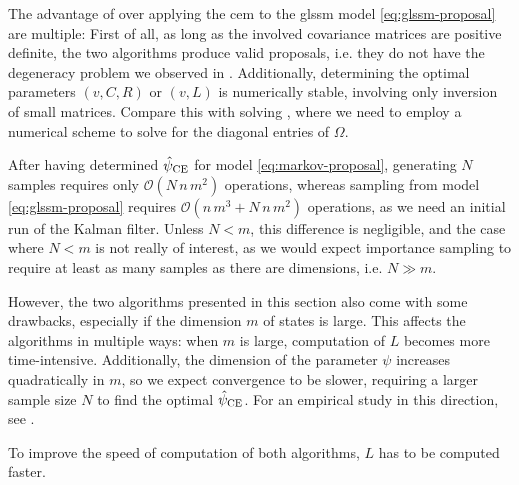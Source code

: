 The advantage of  over applying the \gls{cem} to the \gls{glssm} model \eqref{eq:glssm-proposal} are multiple: First of all, as long as the involved covariance matrices are positive definite, the two algorithms produce valid proposals, i.e. they do not have the degeneracy problem we observed in .
Additionally, determining the optimal parameters $(v,C,R)$ or $(v,L)$ is numerically stable, involving only inversion of small matrices. Compare this with solving , where we need to employ a numerical scheme to solve for the diagonal entries of $\Omega$.

After having determined ${\hat\psi_{\text{CE}}}$ for model \eqref{eq:markov-proposal}, generating $N$ samples requires only $\mathcal O(N\,n\,m^{2})$ operations, whereas sampling from model \eqref{eq:glssm-proposal} requires $\mathcal O(n\,m^{3} + N\,n\,m^{2})$ operations, as we need an initial run of the Kalman filter. Unless $N < m$, this difference is negligible, and the case where $N < m$ is not really of interest, as we would expect importance sampling to require at least as many samples as there are dimensions, i.e. $N \gg m$. 

However, the two algorithms presented in this section also come with some drawbacks, especially if the dimension $m$ of states is large. This affects the algorithms in multiple ways: when $m$ is large, computation of $L$ becomes more time-intensive. Additionally, the dimension of the parameter $\psi$ increases quadratically in $m$, so we expect convergence to be slower, requiring a larger sample size $N$ to find the optimal ${\hat\psi_{\text{CE}}}$. For an empirical study in this direction, see .

To improve the speed of computation of both algorithms, $L$ has to be computed faster. 